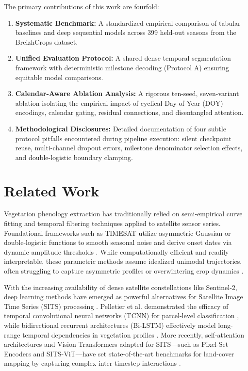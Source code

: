 \documentclass[runningheads]{llncs}
\begin{document}
The primary contributions of this work are fourfold:
\begin{enumerate}
    \item \textbf{Systematic Benchmark:} A standardized empirical comparison of tabular baselines and deep sequential models across 399 held-out seasons from the BreizhCrops dataset.
    \item \textbf{Unified Evaluation Protocol:} A shared dense temporal segmentation framework with deterministic milestone decoding (Protocol A) ensuring equitable model comparisons.
    \item \textbf{Calendar-Aware Ablation Analysis:} A rigorous ten-seed, seven-variant ablation isolating the empirical impact of cyclical Day-of-Year (DOY) encodings, calendar gating, residual connections, and disentangled attention.
    \item \textbf{Methodological Disclosures:} Detailed documentation of four subtle protocol pitfalls encountered during pipeline execution: silent checkpoint reuse, multi-channel dropout errors, milestone denominator selection effects, and double-logistic boundary clamping.
\end{enumerate}

\section{Related Work}
Vegetation phenology extraction has traditionally relied on semi-empirical curve fitting and temporal filtering techniques applied to satellite sensor series. Foundational frameworks such as TIMESAT utilize asymmetric Gaussian or double-logistic functions to smooth seasonal noise and derive onset dates via dynamic amplitude thresholds \cite{timesat,review,beck,savitzky}. While computationally efficient and readily interpretable, these parametric methods assume idealized unimodal trajectories, often struggling to capture asymmetric profiles or overwintering crop dynamics \cite{boschetti,jakubauskas}.

With the increasing availability of dense satellite constellations like Sentinel-2, deep learning methods have emerged as powerful alternatives for Satellite Image Time Series (SITS) processing \cite{breizhcrops,sen2agri}. Pelletier et al. demonstrated the efficacy of temporal convolutional neural networks (TCNN) for parcel-level classification \cite{pelletier}, while bidirectional recurrent architectures (Bi-LSTM) effectively model long-range temporal dependencies in vegetation profiles \cite{bilstm}. More recently, self-attention architectures and Vision Transformers adapted for SITS---such as Pixel-Set Encoders and SITS-ViT---have set state-of-the-art benchmarks for land-cover mapping by capturing complex inter-timestep interactions \cite{pixelset,sitsvit}. 
\end{document}
